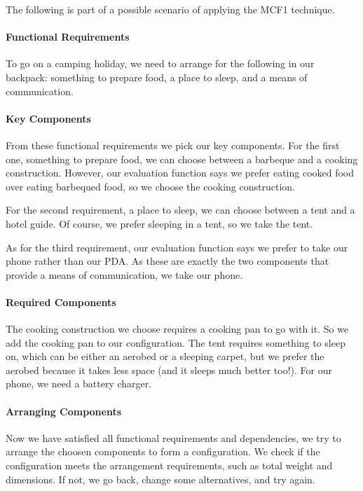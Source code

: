 \documentclass[a4paper,11pt]{article}
\begin{document}
The following is part of a possible scenario of applying the
MCF1 technique.

\paragraph{Functional Requirements}

To go on a camping holiday, we need to arrange for the following
in our backpack: something to prepare food, a place to sleep, and
a means of communication.

\paragraph{Key Components}

From these functional requirements we pick our key components. For
the first one, something to prepare food, we can choose between a
barbeque and a cooking construction. However, our evaluation
function says we prefer eating cooked food over eating barbequed
food, so we choose the cooking construction.

For the second requirement, a place to sleep, we can choose between
a tent and a hotel guide. Of course, we prefer sleeping in a tent,
so we take the tent.

As for the third requirement, our evaluation function says we prefer
to take our phone rather than our PDA. As these are exactly the two
components that provide a means of communication, we take our phone.

\paragraph{Required Components}

The cooking construction we choose requires a cooking pan to go
with it. So we add the cooking pan to our configuration. The tent
requires something to sleep on, which can be either an aerobed or
a sleeping carpet, but we prefer the aerobed because it takes less
space (and it sleeps much better too!). For our phone, we need a
battery charger.

\paragraph{Arranging Components}

Now we have satisfied all functional requirements and dependencies,
we try to arrange the choosen components to form a configuration. We
check if the configuration meets the arrangement requirements, such
as total weight and dimensions. If not, we go back, change some
alternatives, and try again.
\end{document}
